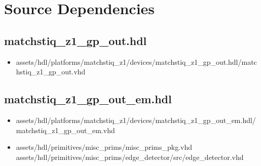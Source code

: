 \documentclass{article}
\begin{document}
\section*{Source Dependencies}
\subsection*{matchstiq\_z1\_gp\_out.hdl}
	\begin{itemize}
		\item assets/hdl/platforms/matchstiq\_z1/devices/matchstiq\_z1\_gp\_out.hdl/matchstiq\_z1\_gp\_out.vhd
	\end{itemize}

\subsection*{matchstiq\_z1\_gp\_out\_em.hdl}
	\begin{itemize}
		\item assets/hdl/platforms/matchstiq\_z1/devices/matchstiq\_z1\_gp\_out\_em.hdl/matchstiq\_z1\_gp\_out\_em.vhd
\item assets/hdl/primitives/misc\_prims/misc\_prims\_pkg.vhd
	      \subitem assets/hdl/primitives/misc\_prims/edge\_detector/src/edge\_detector.vhd
\end{itemize}
\end{document}
